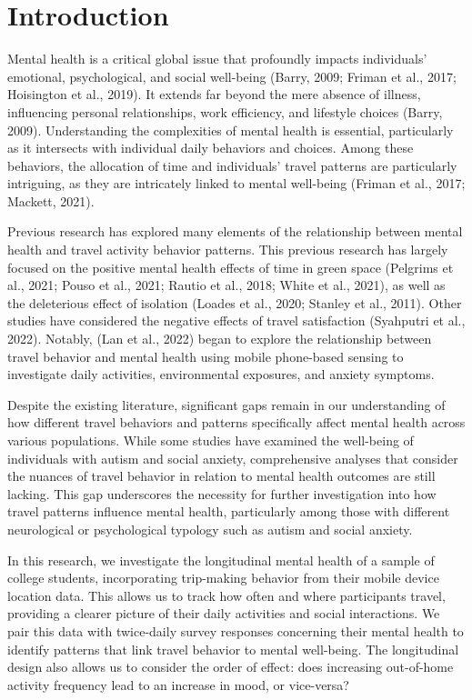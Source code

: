 \documentclass[
  letterpaper,
  number,
  review,
  3p]{elsarticle}
\begin{document}

\section{Introduction}\label{sec-intro}

Mental health is a critical global issue that profoundly impacts
individuals' emotional, psychological, and social well-being (Barry,
2009; Friman et al., 2017; Hoisington et al., 2019). It extends far
beyond the mere absence of illness, influencing personal relationships,
work efficiency, and lifestyle choices (Barry, 2009). Understanding the
complexities of mental health is essential, particularly as it
intersects with individual daily behaviors and choices. Among these
behaviors, the allocation of time and individuals' travel patterns are
particularly intriguing, as they are intricately linked to mental
well-being (Friman et al., 2017; Mackett, 2021).

Previous research has explored many elements of the relationship between
mental health and travel activity behavior patterns. This previous
research has largely focused on the positive mental health effects of
time in green space (Pelgrims et al., 2021; Pouso et al., 2021; Rautio
et al., 2018; White et al., 2021), as well as the deleterious effect of
isolation (Loades et al., 2020; Stanley et al., 2011). Other studies
have considered the negative effects of travel satisfaction (Syahputri
et al., 2022). Notably, (Lan et al., 2022) began to explore the
relationship between travel behavior and mental health using mobile
phone-based sensing to investigate daily activities, environmental
exposures, and anxiety symptoms.

Despite the existing literature, significant gaps remain in our
understanding of how different travel behaviors and patterns
specifically affect mental health across various populations. While some
studies have examined the well-being of individuals with autism and
social anxiety, comprehensive analyses that consider the nuances of
travel behavior in relation to mental health outcomes are still lacking.
This gap underscores the necessity for further investigation into how
travel patterns influence mental health, particularly among those with
different neurological or psychological typology such as autism and
social anxiety.

In this research, we investigate the longitudinal mental health of a
sample of college students, incorporating trip-making behavior from
their mobile device location data. This allows us to track how often and
where participants travel, providing a clearer picture of their daily
activities and social interactions. We pair this data with twice-daily
survey responses concerning their mental health to identify patterns
that link travel behavior to mental well-being. The longitudinal design
also allows us to consider the order of effect: does increasing
out-of-home activity frequency lead to an increase in mood, or
vice-versa?
\end{document}
